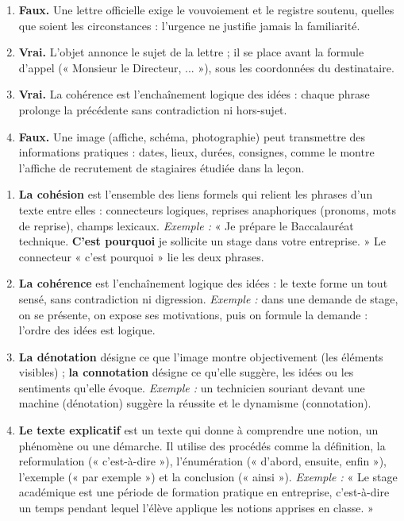 \documentclass[11pt]{article}
\newcommand{\cle}[1]{{\popxbold\color{popdark}#1}}
\begin{document}
\begin{corrige}
\begin{enumerate}
\item \textbf{Faux.} Une lettre officielle exige le vouvoiement et le registre soutenu, quelles que soient les circonstances : l'urgence ne justifie jamais la familiarité.
\item \textbf{Vrai.} L'objet annonce le sujet de la lettre ; il se place avant la formule d'appel (« Monsieur le Directeur, ... »), sous les coordonnées du destinataire.
\item \textbf{Vrai.} La \cle{cohérence} est l'enchaînement logique des idées : chaque phrase prolonge la précédente sans contradiction ni hors-sujet.
\item \textbf{Faux.} Une image (affiche, schéma, photographie) peut transmettre des informations pratiques : dates, lieux, durées, consignes, comme le montre l'affiche de recrutement de stagiaires étudiée dans la leçon.
\end{enumerate}
\end{corrige}

\begin{corrige}
\begin{enumerate}
\item \textbf{La cohésion} est l'ensemble des liens formels qui relient les phrases d'un texte entre elles : connecteurs logiques, reprises anaphoriques (pronoms, mots de reprise), champs lexicaux. \emph{Exemple :} « Je prépare le Baccalauréat technique. \textbf{C'est pourquoi} je sollicite un stage dans votre entreprise. » Le connecteur « c'est pourquoi » lie les deux phrases.
\item \textbf{La cohérence} est l'enchaînement logique des idées : le texte forme un tout sensé, sans contradiction ni digression. \emph{Exemple :} dans une demande de stage, on se présente, on expose ses motivations, puis on formule la demande : l'ordre des idées est logique.
\item \textbf{La dénotation} désigne ce que l'image montre objectivement (les éléments visibles) ; \textbf{la connotation} désigne ce qu'elle suggère, les idées ou les sentiments qu'elle évoque. \emph{Exemple :} un technicien souriant devant une machine (dénotation) suggère la réussite et le dynamisme (connotation).
\item \textbf{Le texte explicatif} est un texte qui donne à comprendre une notion, un phénomène ou une démarche. Il utilise des procédés comme la définition, la reformulation (« c'est-à-dire »), l'énumération (« d'abord, ensuite, enfin »), l'exemple (« par exemple ») et la conclusion (« ainsi »). \emph{Exemple :} « Le stage académique est une période de formation pratique en entreprise, c'est-à-dire un temps pendant lequel l'élève applique les notions apprises en classe. »
\end{enumerate}
\end{corrige}
\end{document}
